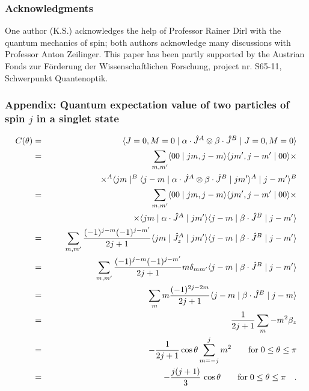 \subsubsection*{Acknowledgments}
One author (K.S.) acknowledges the help of Professor Rainer Dirl
with the quantum mechanics of spin; both authors acknowledge many
discussions with Professor Anton Zeilinger.
This paper has been partly supported by the Austrian Fonds zur
F\"orderung der Wissenschaftlichen Forschung, project nr. S65-11,
Schwerpunkt Quantenoptik.
\newpage

\subsubsection*{Appendix: Quantum expectation value of two particles of
spin $j$ in a singlet state}
\begin{eqnarray}
C(\theta )&=&
\langle J= 0 ,M= 0\mid \alpha \cdot \hat{J}^A \otimes \beta \cdot
\hat{J}^B\mid
J=0,M=0\rangle
\nonumber
 \\
&=&
 \sum_{m,m'}
\langle  00 \mid jm,j-m \rangle
\langle  jm',j-m'\mid 00 \rangle \times \nonumber
\\
&&
\qquad
\qquad
\qquad
\times
^A\langle jm\mid  ^B\langle j-m\mid
\alpha \cdot \hat{J}^A \otimes \beta \cdot \hat{J}^B
\mid jm'\rangle ^A \mid j-m'\rangle ^B  \nonumber
\\
&=&
 \sum_{m,m'}
\langle  00 \mid jm,j-m \rangle
\langle  jm',j-m'\mid 00 \rangle       \times \nonumber  \\
&&
\qquad
\qquad
\qquad   \times
\langle jm\mid
\alpha \cdot \hat{J}^{A}
\mid jm'\rangle
 \langle j-m\mid
 \beta \cdot \hat{J}^B
 \mid j-m'\rangle                             \nonumber
\\
&=&
 \sum_{m,m'}
{(-1)^{j-m}(-1)^{j-m'}\over 2j+1}
\langle jm\mid
 \hat{J}^A_z
\mid jm'\rangle
\langle j-m\mid
 \beta \cdot \hat{J}^B
 \mid j-m'\rangle \nonumber
\\
&=&
 \sum_{m,m'}
{(-1)^{j-m}(-1)^{j-m'}\over 2j+1}
m \delta _{m m'}
\langle j-m\mid
 \beta \cdot \hat{J}^B
 \mid j-m'\rangle \nonumber
\\
&=&  \sum_m
m{(-1)^{2j-2m}\over 2j+1}
 \langle j-m\mid
 \beta \cdot \hat{J}^B
 \mid j-m\rangle  \nonumber
\\
&=& {1\over 2j+1}  \sum_m
-m^2 \beta_z      \nonumber
\\
&=& -{1 \over 2j+1}\cos \theta  \sum_{m=-j}^j
m^2
\qquad {\rm for} \; 0\le \theta \le \pi
 \nonumber
\\
&=&- {j(j+1)\over 3} \, \cos \theta
\qquad {\rm for} \; 0\le \theta \le \pi
\quad .
 \nonumber
\end{eqnarray}

